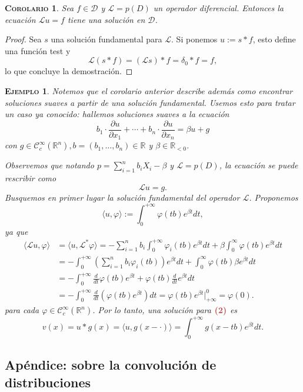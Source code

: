 \documentclass[11pt]{article}
\theoremstyle{colored}
\newtheorem{corollary}{\scshape Corolario}
\newtheorem{example}{\scshape Ejemplo}
\newcommand{\R}{\mathbb{R}}
\newcommand{\C}{\mathscr{C}}
\newcommand{\test}{\mathscr{D}}
\newcommand{\ev}[1]{\langle #1 \rangle}
\renewcommand{\L}{\mathscr{L}}
\newcommand{\paint}[1]{\color{color}{#1}}
\newcommand{\tpaint}[1]{\paint{\textbf{#1}}}
\begin{document}
\begin{corollary} Sea $f \in \test$ y $\L = p(D)$ un operador diferencial. Entonces la ecuación $\L u = f$ tiene una solución en $\test$.
\end{corollary}
\begin{proof} Sea $s$ una solución fundamental para $\L$. Si ponemos $u := s \ast f$, esto define una función test y
\[
\L (s \ast f) = (\L s) \ast f = \delta_0 \ast f = f,
\]
lo que concluye la demostración.
\end{proof}

\begin{example} Notemos que el corolario anterior describe además como encontrar soluciones suaves a partir de una solución fundamental. Usemos esto para tratar un caso ya conocido: hallemos soluciones suaves a la ecuación
\[
b_1 \cdot \frac{\partial u}{\partial x_1} + \cdots + b_n \cdot \frac{\partial u}{\partial x_n} = \beta u + g \tag{2}
\]
con $g \in \C_c^\infty(\R^n), b = (b_1, \dots, b_n) \in \R$ y $\beta \in \R_{ < 0}$. 

Observemos que notando $p = \sum_{i=1}^n b_i X_i - \beta$ y $\L = p(D)$, la ecuación se puede rescribir como
\[
\L u = g.
\]
Busquemos en primer lugar la solución fundamental del operador $\L$. Proponemos 
\[
\ev{u,\varphi} := \int_{0}^{+\infty}\varphi(tb)e^{\beta t}dt,
\]
ya que
\begin{align*}
\ev{\L u, \varphi} &= \ev{u,\L^\ast \varphi} = - \sum_{i=1}^n b_i \int_{0}^{+\infty}\varphi_i(tb)e^{\beta t}dt + \beta \int_0^{\infty}\varphi(tb)e^{\beta t}dt\\
&= -\int_{0}^{+\infty}\left(\sum_{i=1}^n b_i \varphi_i(tb)\right)e^{\beta t}dt +  \int_0^{\infty}\varphi(tb)\beta e^{\beta t}dt\\
&= - \int_{0}^{+\infty} \frac{d}{dt}\varphi(tb) e^{\beta t} + \varphi(tb)\frac{d}{dt}e^{\beta t}dt\\
&= -\int_{0}^{+\infty}\frac{d}{dt}(\varphi(tb)e^{\beta t})dt = \varphi(tb)e^{\beta t} \Bigg|_{+\infty}^0 = \varphi(0).
\end{align*}
para cada $\varphi \in \C_c^\infty(\R^n)$. Por lo tanto, una solución para $\tpaint{(2)}$ es
\[
v(x) = u \ast g(x) = \ev{u, g(x - \cdot)} = \int_{0}^{+\infty}g(x-tb)e^{\beta t}dt.
\] 
\end{example}

\subsection{Apéndice: sobre la convolución de distribuciones}
\end{document}
